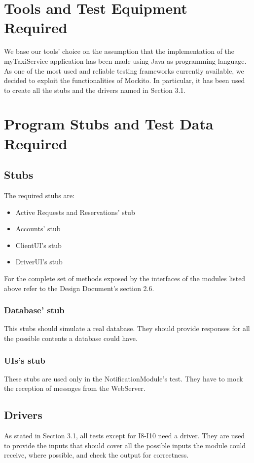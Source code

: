 \documentclass{article}
\begin{document}
\section{Tools and Test Equipment Required}
We base our tools' choice on the assumption that
the implementation of the myTaxiService application
has been made using Java as programming language.
As one of the most used and reliable testing frameworks
currently available, we decided to exploit the
functionalities of Mockito. In particular, it
has been used to create all the stubs and the drivers
named in Section 3.1.
\section{Program Stubs and Test Data Required}
\subsection{Stubs}
The required stubs are:
\begin{itemize}
	\item Active Requests and Reservations' stub
	\item Accounts' stub
	\item ClientUI's stub
	\item DriverUI's stub
\end{itemize}
For the complete set of methods exposed by the 
interfaces of the modules listed above refer
to the Design Document's section 2.6.
\subsubsection{Database' stub}
This stubs should simulate a real database. They 
should provide responses for all the possible contents 
a database could have.
\subsubsection{UIs's stub}
These stubs are used only in the NotificationModule's test.
They have to mock the reception of messages from the WebServer.
\subsection{Drivers}
As stated in Section 3.1, all tests except for I8-I10 need 
a driver. They are used to provide the inputs that should cover
all the possible inputs the module could receive, where possible, 
and check the output for correctness.
\end{document}
